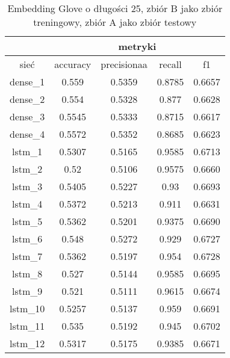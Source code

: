 \begin{table}[h] \centering
    \caption{Embedding Glove o długości 25, zbiór B jako zbiór treningowy, zbiór A jako zbiór testowy }
    \label{tab:wyniki_25_eks2}
    \begin{tabular}{|c|c|c|c|c|}
        \hline
                 & \multicolumn{4}{c|}{metryki}                                 \\ \hline
        sieć     & accuracy                     & precisionaa & recall & f1     \\ \hline
        dense\_1 & 0.559                        & 0.5359      & 0.8785 & 0.6657 \\ \hline
        dense\_2 & 0.554                        & 0.5328      & 0.877  & 0.6628 \\ \hline
        dense\_3 & 0.5545                       & 0.5333      & 0.8715 & 0.6617 \\ \hline
        dense\_4 & 0.5572                       & 0.5352      & 0.8685 & 0.6623 \\ \hline
        lstm\_1  & 0.5307                       & 0.5165      & 0.9585 & 0.6713 \\ \hline
        lstm\_2  & 0.52                         & 0.5106      & 0.9575 & 0.6660 \\ \hline
        lstm\_3  & 0.5405                       & 0.5227      & 0.93   & 0.6693 \\ \hline
        lstm\_4  & 0.5372                       & 0.5213      & 0.911  & 0.6631 \\ \hline
        lstm\_5  & 0.5362                       & 0.5201      & 0.9375 & 0.6690 \\ \hline
        lstm\_6  & 0.548                        & 0.5272      & 0.929  & 0.6727 \\ \hline
        lstm\_7  & 0.5362                       & 0.5197      & 0.954  & 0.6728 \\ \hline
        lstm\_8  & 0.527                        & 0.5144      & 0.9585 & 0.6695 \\ \hline
        lstm\_9  & 0.521                        & 0.5111      & 0.9615 & 0.6674 \\ \hline
        lstm\_10 & 0.5257                       & 0.5137      & 0.959  & 0.6691 \\ \hline
        lstm\_11 & 0.535                        & 0.5192      & 0.945  & 0.6702 \\ \hline
        lstm\_12 & 0.5317                       & 0.5175      & 0.9385 & 0.6671 \\ \hline

\end{tabular}
\end{table}
